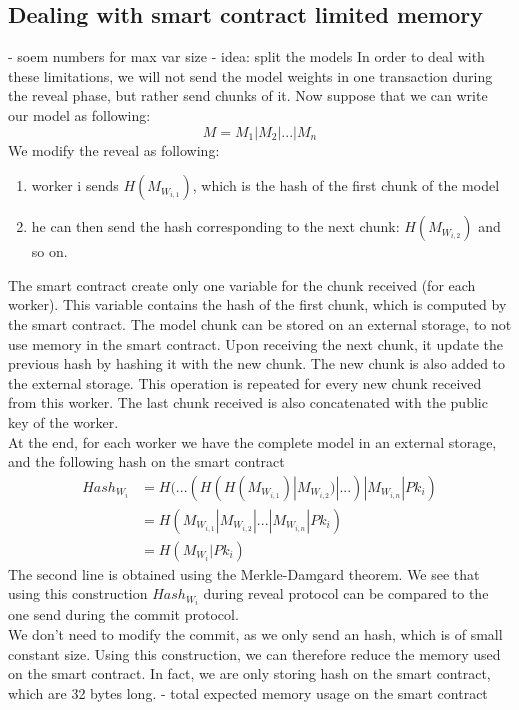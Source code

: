 \documentclass{article}
\begin{document}
\subsection{Dealing with smart contract limited memory}
- soem numbers for max var size
- idea: split the models
In order to deal with these limitations, we will not send the model weights in one transaction during the reveal phase,
but rather send chunks of it. Now suppose that we can write our model as following:
\begin{equation}
    M = M_1 | M_2 | ... | M_n
\end{equation}
We modify the reveal as following:
\begin{enumerate}
    \item worker i sends $H(M_{W_{i, 1}})$, which is the hash of the first chunk of the model
    \item he can then send the hash corresponding to the next chunk: $H(M_{W_{i, 2}})$ and so on.
\end{enumerate}
The smart contract create only one variable for the chunk received (for each worker). This variable contains the hash
of the first chunk, which is computed by the smart contract. The model chunk can be stored on an external storage, to
not use memory in the smart contract. Upon receiving the next chunk,
it update the previous hash by hashing it with the new chunk. The new chunk is also added to the external storage. This
operation is repeated for every new chunk received from this worker. The last chunk received is also concatenated with
the public key of the worker.\\
At the end, for each worker we have the complete model in an external storage, and the following hash on the smart contract
\begin{equation}
    \begin{split}
         Hash_{W_i} & = H(...(H(H(M_{W_{i, 1}})|M_{W_{i, 2}})|...)|M_{W_{i, n}}|Pk_i) \\
         & = H(M_{W_{i, 1}} | M_{W_{i, 2}} | ... | M_{W_{i, n}} | Pk_i) \\
         & = H (M_{W_i} | Pk_i)
        \end{split}
\end{equation}
The second line is obtained using the Merkle-Damgard theorem. We see that using this construction
$Hash_{W_i}$ during reveal protocol can be compared to the one send during the commit protocol. \\
We don't need to modify the commit, as we only send an hash, which is of small constant size. Using this construction,
we can therefore reduce the memory used on the smart contract. In fact, we are only storing hash on the smart contract,
which are 32 bytes long.
- total expected memory usage on the smart contract
\end{document}
